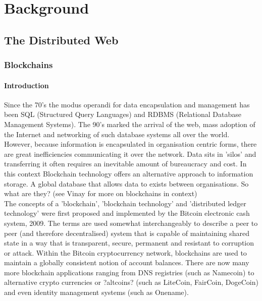
\chapter{Background} %

\label{Background} %

\section{The Distributed Web}

\subsection{Blockchains}

\subsubsection{Introduction}
Since the 70's the modus operandi for data encapsulation and management has been SQL (Structured Query Languages) and RDBMS (Relational Database Management Systems). The 90's marked the arrival of the web, mass adoption of the Internet and networking of such database systems all over the world. However, because information is encapsulated in organisation centric forms, there are great inefficiencies communicating it over the network. Data sits in 'silos' and transferring it often requires an inevitable amount of bureaucracy and cost. In this context Blockchain technology offers an alternative approach to information storage. A global database that allows data to exists between organisations. So what are they? (see Vinay \cite{VinayOnBlockchains} for more on blockchains in context) \\

The concepts of a 'blockchain',  'blockchain technology' and 'distributed ledger technology' were first proposed and implemented by the Bitcoin electronic cash system, 2009\cite{nakamoto2008bitcoin}. The terms are used somewhat interchangeably to describe a peer to peer (and therefore decentralised) system that is capable of maintaining shared state in a way that is transparent, secure, permanent and resistant to corruption or attack. Within the Bitcoin cryptocurrency network, blockchains are used to maintain a globally consistent notion of account balances. There are now many more blockchain applications ranging from DNS registries (such as Namecoin\cite{Namecoin}) to alternative crypto currencies or ?altcoins? (such as LiteCoin\cite{Litecoin}, FairCoin\cite{Faircoin}, DogeCoin\cite{Dogecoin}) and even identity management systems (such as Onename\cite{Onename}). \\

